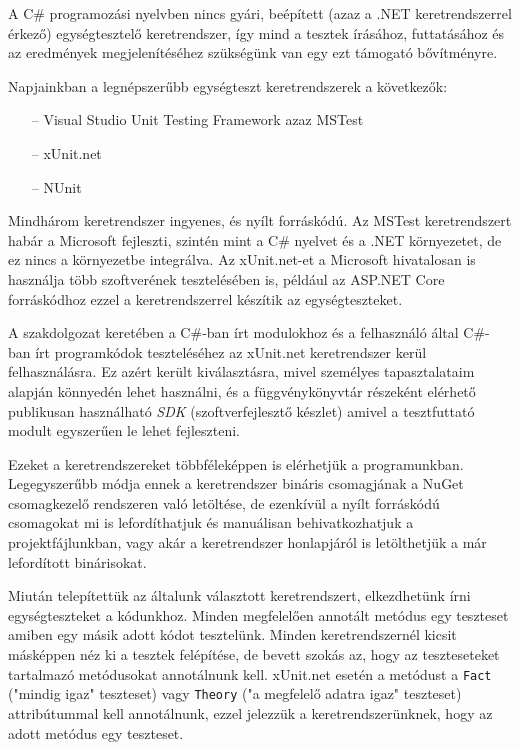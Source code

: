 
A C\# programozási nyelvben nincs gyári, beépített (azaz a .NET keretrendszerrel érkező) egységtesztelő keretrendszer, így mind a tesztek írásához, futtatásához és az eredmények megjelenítéséhez szükségünk van egy ezt támogató bővítményre.

Napjainkban a legnépszerűbb egységteszt keretrendszerek a következők:
\begin{itemize}
    \item[--] Visual Studio Unit Testing Framework azaz MSTest
    \item[--] xUnit.net
    \item[--] NUnit
\end{itemize}

Mindhárom keretrendszer ingyenes, és nyílt forráskódú. Az MSTest keretrendszert habár a Microsoft fejleszti, szintén mint a C\# nyelvet és a .NET környezetet, de ez nincs a környezetbe integrálva. Az xUnit.net-et a Microsoft hivatalosan is használja több szoftverének tesztelésében is, például az ASP.NET Core forráskódhoz ezzel a keretrendszerrel készítik az egységteszteket.

A szakdolgozat keretében a C\#-ban írt modulokhoz és a felhasználó által C\#-ban írt programkódok teszteléséhez az xUnit.net keretrendszer kerül felhasználásra. Ez azért került kiválasztásra, mivel személyes tapasztalataim alapján könnyedén lehet használni, és a függvénykönyvtár részeként elérhető publikusan használható \emph{SDK} (szoftverfejlesztő készlet) amivel a tesztfuttató modult egyszerűen le lehet fejleszteni.

Ezeket a keretrendszereket többféleképpen is elérhetjük a programunkban.
Legegyszerűbb módja ennek a keretrendszer bináris csomagjának a NuGet csomagkezelő rendszeren való letöltése, de ezenkívül a nyílt forráskódú csomagokat mi is lefordíthatjuk és manuálisan behivatkozhatjuk a projektfájlunkban, vagy akár a keretrendszer honlapjáról is letölthetjük a már lefordított binárisokat.

Miután telepítettük az általunk választott keretrendszert, elkezdhetünk írni egységteszteket a kódunkhoz. Minden megfelelően annotált metódus egy teszteset amiben egy másik adott kódot tesztelünk. Minden keretrendszernél kicsit másképpen néz ki a tesztek felépítése, de bevett szokás az, hogy az teszteseteket tartalmazó metódusokat annotálnunk kell. xUnit.net esetén a metódust a \texttt{Fact} ("mindig igaz" teszteset) vagy \texttt{Theory} ("a megfelelő adatra igaz" teszteset) attribútummal kell annotálnunk, ezzel jelezzük a keretrendszerünknek, hogy az adott metódus egy teszteset.

